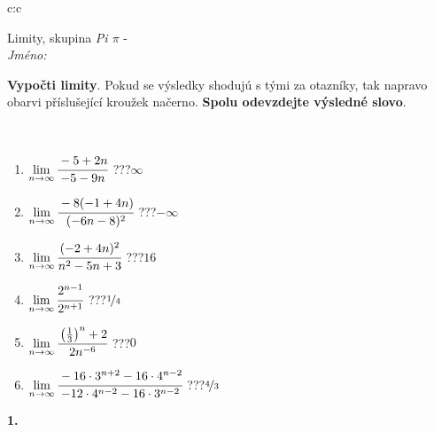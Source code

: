 \documentclass[10pt]{report}
\begin{document}
\begin{tabular}{c:c}
\begin{minipage}[c][104.5mm][t]{0.5\linewidth}
\begin{center}
\vspace{7mm}
{\huge Limity, skupina \textit{Pi $\pi$} -}\\[5mm]
\textit{Jméno:}\phantom{xxxxxxxxxxxxxxxxxxxxxxxxxxxxxxxxxxxxxxxxxxxxxxxxxxxxxxxxxxxxxxxxx}\\[5mm]
\begin{minipage}{0.95\linewidth}
\begin{center}
\textbf{Vypočti limity}. Pokud se výsledky shodujú s tými za otazníky, tak napravo\\obarvi příslušející kroužek načerno. \textbf{Spolu odevzdejte výsledné slovo}.
\end{center}
\end{minipage}
\\[1mm]
\begin{minipage}{0.79\linewidth}
\begin{center}
\begin{varwidth}{\linewidth}
\begin{enumerate}
\normalsize
\item $\lim\limits_{n\to\infty}\cfrac{-5+2n}{-5-9n}$\quad \dotfill\; ???\;\dotfill \quad $\infty$
\item $\lim\limits_{n\to\infty}\cfrac{-8(-1+4n)}{(-6n-8)^2}$\quad \dotfill\; ???\;\dotfill \quad $-\infty$
\item $\lim\limits_{n\to\infty}\cfrac{(-2+4n)^2}{n^2-5n+3}$\quad \dotfill\; ???\;\dotfill \quad $16$
\item $\lim\limits_{n\to\infty}\cfrac{2^{n-1}}{2^{n+1}}$\quad \dotfill\; ???\;\dotfill \quad $\nicefrac{1}{4}$
\item $\lim\limits_{n\to\infty}\cfrac{\left(\frac{1}{3}\right)^n +2}{2n^{-6}}$\quad \dotfill\; ???\;\dotfill \quad $0$
\item $\lim\limits_{n\to\infty}\cfrac{-16\cdot 3^{n+2}-16\cdot 4^{n-2}}{-12\cdot 4^{n-2}-16\cdot 3^{n-2}}$\quad \dotfill\; ???\;\dotfill \quad $\nicefrac{4}{3}$
\end{enumerate}
\end{varwidth}
\end{center}
\end{minipage}
\begin{minipage}{0.20\linewidth}
\begin{center}
{\Huge\bfseries 1.} \\[2mm]

\end{center}
\end{minipage}
\end{center}
\end{minipage}
\end{tabular}
\end{document}
